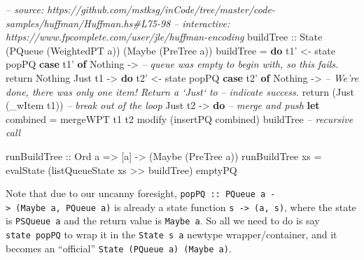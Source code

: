 \documentclass[]{article}
\newenvironment{Shaded}{}{}
\newcommand{\KeywordTok}[1]{\textcolor[rgb]{0.00,0.44,0.13}{\textbf{#1}}}
\newcommand{\DataTypeTok}[1]{\textcolor[rgb]{0.56,0.13,0.00}{#1}}
\newcommand{\CommentTok}[1]{\textcolor[rgb]{0.38,0.63,0.69}{\textit{#1}}}
\newcommand{\OtherTok}[1]{\textcolor[rgb]{0.00,0.44,0.13}{#1}}
\newcommand{\FunctionTok}[1]{\textcolor[rgb]{0.02,0.16,0.49}{#1}}
\newcommand{\NormalTok}[1]{#1}
\begin{document}
\begin{Shaded}
\begin{Highlighting}[]
\CommentTok{-- source: https://github.com/mstksg/inCode/tree/master/code-samples/huffman/Huffman.hs#L75-98}
\CommentTok{-- interactive: https://www.fpcomplete.com/user/jle/huffman-encoding}
\OtherTok{buildTree ::} \DataTypeTok{State}\NormalTok{ (}\DataTypeTok{PQueue}\NormalTok{ (}\DataTypeTok{WeightedPT}\NormalTok{ a)) (}\DataTypeTok{Maybe}\NormalTok{ (}\DataTypeTok{PreTree}\NormalTok{ a))}
\NormalTok{buildTree }\FunctionTok{=} \KeywordTok{do}
\NormalTok{    t1' }\OtherTok{<-}\NormalTok{ state popPQ}
    \KeywordTok{case}\NormalTok{ t1' }\KeywordTok{of}
      \DataTypeTok{Nothing} \OtherTok{->}
        \CommentTok{-- queue was empty to begin with, so this fails.}
\NormalTok{        return }\DataTypeTok{Nothing}
      \DataTypeTok{Just}\NormalTok{ t1 }\OtherTok{->} \KeywordTok{do}
\NormalTok{        t2' }\OtherTok{<-}\NormalTok{ state popPQ}
        \KeywordTok{case}\NormalTok{ t2' }\KeywordTok{of}
          \DataTypeTok{Nothing}  \OtherTok{->}
            \CommentTok{-- We're done, there was only one item!  Return a `Just` to}
            \CommentTok{-- indicate success.}
\NormalTok{            return (}\DataTypeTok{Just}\NormalTok{ (_wItem t1))     }\CommentTok{-- break out of the loop}
          \DataTypeTok{Just}\NormalTok{ t2 }\OtherTok{->} \KeywordTok{do}
            \CommentTok{-- merge and push}
            \KeywordTok{let}\NormalTok{ combined }\FunctionTok{=}\NormalTok{ mergeWPT t1 t2}
\NormalTok{            modify (insertPQ combined)}
\NormalTok{            buildTree                     }\CommentTok{-- recursive call}

\OtherTok{runBuildTree ::} \DataTypeTok{Ord}\NormalTok{ a }\OtherTok{=>}\NormalTok{ [a] }\OtherTok{->}\NormalTok{ (}\DataTypeTok{Maybe}\NormalTok{ (}\DataTypeTok{PreTree}\NormalTok{ a))}
\NormalTok{runBuildTree xs }\FunctionTok{=}\NormalTok{ evalState (listQueueState xs }\FunctionTok{>>}\NormalTok{ buildTree) emptyPQ}
\end{Highlighting}
\end{Shaded}

Note that due to our uncanny foresight,
\texttt{popPQ\ ::\ PQueue\ a\ -\textgreater{}\ (Maybe\ a,\ PQueue\ a)} is
already a state function \texttt{s\ -\textgreater{}\ (a,\ s)}, where the state
is \texttt{PSQueue\ a} and the return value is \texttt{Maybe\ a}. So all we need
to do is say \texttt{state\ popPQ} to wrap it in the \texttt{State\ s\ a}
newtype wrapper/container, and it becomes an ``official''
\texttt{State\ (PQueue\ a)\ (Maybe\ a)}.
\end{document}
